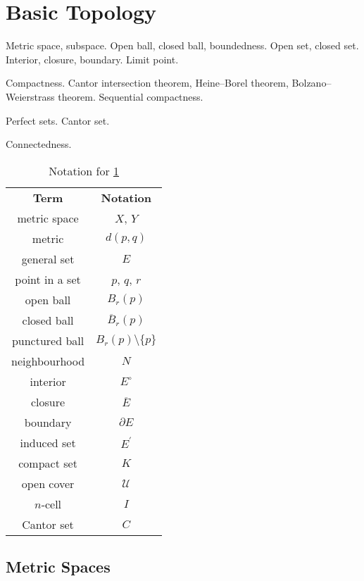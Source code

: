 \chapter{Basic Topology}\label{chap:basic-topology}
\begin{summary}
\item Metric space, subspace. Open ball, closed ball, boundedness. Open set, closed set. Interior, closure, boundary. Limit point.  
\item Compactness. Cantor intersection theorem, Heine--Borel theorem, Bolzano--Weierstrass theorem. Sequential compactness.
\item Perfect sets. Cantor set.
\item Connectedness.
\end{summary}

\begin{table}[H]
\centering
\begin{tabular}{cc}
\textbf{Term} & \textbf{Notation}\\
metric space & $X$, $Y$\\
metric & $d(p,q)$\\
general set & $E$\\
point in a set & $p$, $q$, $r$\\
open ball & $B_r(p)$\\
closed ball & $\overline{B}_r(p)$\\
punctured ball & $B_r(p)\setminus\{p\}$\\
neighbourhood & $N$\\
interior & $E^\circ$\\
closure & $\overline{E}$\\
boundary & $\partial E$\\
induced set & $E^\prime$\\
compact set & $K$\\
open cover & $\mathcal{U}$\\
$n$-cell & $I$\\
Cantor set & $C$
\end{tabular}
\caption{Notation for \cref{chap:basic-topology}}
\end{table}

\section{Metric Spaces}
